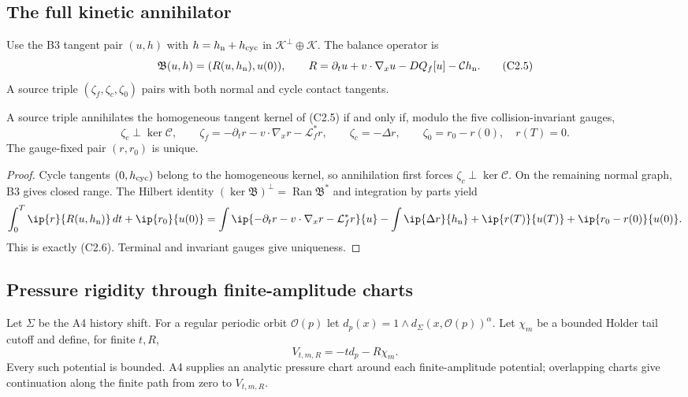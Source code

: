 \subsection{The full kinetic annihilator}

Use the B3 tangent pair $(u,h)$ with
$h=h_{\rm n}+h_{\rm cyc}$ in
$\mathcal K^\perp\oplus\mathcal K$.  The balance operator is
\[
 \mathfrak B(u,h)=
 (R(u,h_{\rm n}),u(0)),\qquad
 R=\partial_tu+v\cdot\nabla_xu-DQ_f[u]-\mathcal Ch_{\rm n}.              \tag{C2.5}
\]
A source triple $(\zeta_f,\zeta_c,\zeta_0)$ pairs with both normal and cycle
contact tangents.

\begin{theorem}
\label{thm:r29-c2-annihilator}
A source triple annihilates the homogeneous tangent kernel of (C2.5) if and
only if, modulo the five collision-invariant gauges,
\[
 \zeta_c\perp\ker\mathcal C,
 \qquad
 \zeta_f=-\partial_tr-v\cdot\nabla_xr-\mathcal L_f^*r,
 \qquad
 \zeta_c=-\Delta r,
 \qquad
 \zeta_0=r_0-r(0),\quad r(T)=0.                           \tag{C2.6}
\]
The gauge-fixed pair $(r,r_0)$ is unique.
\end{theorem}

\begin{proof}
Cycle tangents $(0,h_{\rm cyc})$ belong to the homogeneous kernel, so
annihilation first forces $\zeta_c\perp\ker\mathcal C$.  On the remaining
normal graph, B3 gives closed range.  The Hilbert identity
$(\ker\mathfrak B)^\perp=\operatorname{Ran}\mathfrak B^*$ and integration by
parts yield
\[
 \int_0^T\ip{r}{R(u,h_{\rm n})}\,dt+\ip{r_0}{u(0)}
 =\int\ip{-\partial_tr-v\cdot\nabla_xr-\mathcal L_f^*r}{u}
   -\int\ip{\Delta r}{h_{\rm n}}
   +\ip{r(T)}{u(T)}+\ip{r_0-r(0)}{u(0)}.
\]
This is exactly (C2.6).  Terminal and invariant gauges give uniqueness.
\end{proof}

\subsection{Pressure rigidity through finite-amplitude charts}

Let $\Sigma$ be the A4 history shift.  For a regular periodic orbit
$\mathcal O(p)$ let
$d_p(x)=1\wedge d_\Sigma(x,\mathcal O(p))^\alpha$.  Let $\chi_m$ be a bounded
Holder tail cutoff and define, for finite $t,R$,
\[
 V_{t,m,R}=-t d_p-R\chi_m.                                \tag{C2.7}
\]
Every such potential is bounded.  A4 supplies an analytic pressure chart
around each finite-amplitude potential; overlapping charts give continuation
along the finite path from zero to $V_{t,m,R}$.

